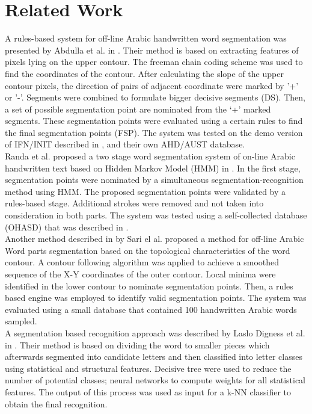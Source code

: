\documentclass[journal,compsoc]{IEEEtran}
\begin{document}
\section{Related Work}
\label{sec:related_word}
A rules-based system for off-line Arabic handwritten word segmentation was presented by Abdulla et al. in \cite{abdulla2008off}. Their method is based on extracting features of pixels lying on the upper contour. The freeman chain coding scheme was used to find the coordinates of the contour. After calculating the slope of the upper contour pixels, the direction of pairs of adjacent coordinate were marked by '+' or '-'. Segments were combined to formulate bigger decisive segments (DS). Then, a set of possible segmentation point are nominated from the ‘+’ marked segments. These segmentation points were evaluated using a certain rules to find the final segmentation points (FSP). The system was tested on the demo version of IFN/INIT described in \cite{pechwitz2002ifn} , and their own AHD/AUST database.\\

Randa et al. proposed a two stage word segmentation system of on-line Arabic handwritten text based on Hidden Markov Model (HMM) in \cite{elanwar2012unconstrained}. In the first stage, segmentation points were nominated by a simultaneous segmentation-recognition method using HMM. The proposed segmentation points were validated by a rules-based stage. Additional strokes were removed and not taken into consideration in both parts. The system was tested using a self-collected database (OHASD) that was described in \cite{elanwar2010ohasd}.\\

Another method described in \cite{sari2002off} by Sari el al. proposed a method for off-line Arabic Word parts segmentation based on the topological characteristics of the word contour. A contour following  algorithm was applied to achieve a smoothed sequence of the X-Y coordinates of the outer contour. Local minima were identified in the lower contour to nominate segmentation points. Then, a rules based engine was employed to identify valid segmentation points. The system was evaluated using a small database that contained 100 handwritten Arabic words sampled.\\

A segmentation based recognition approach was described by Laslo Digness et al. in \cite{Dinges2011}. Their method is based on dividing the word to smaller pieces which afterwards segmented into candidate letters and then classified into letter classes using statistical and structural features. Decisive tree were used to reduce the number of potential classes; neural networks to compute weights for all statistical features. The output of this process was used as input for a k-NN classifier to obtain the final recognition.\\
\end{document}
